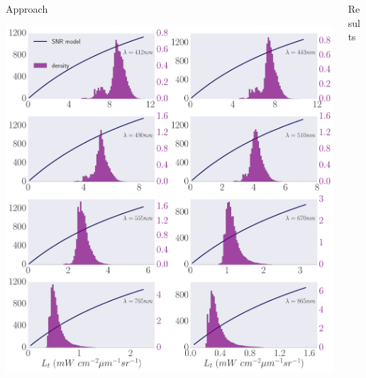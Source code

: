 \documentclass[final]{beamer}
\newlength{\sepwid}
\newlength{\onecolwid}
\newlength{\twocolwid}
\begin{document}
\begin{frame}[t]
\begin{columns}[t]
\begin{column}{\onecolwid}
\begin{block}{Approach}
\begin{framed}
\includegraphics[width=1.0\linewidth]{snrmodelLong.pdf}
\label{fig:snf model}
\end{framed}
\end{block}

\end{column} %


\begin{column}{\twocolwid} %
\begin{block}{Results}


\end{block}
\end{column}
\end{columns}
\end{frame}
\end{document}
